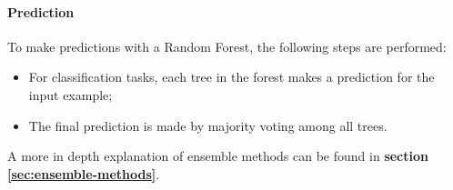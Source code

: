 \paragraph{Prediction}
To make predictions with a Random Forest, the following steps are performed:
\begin{itemize}
    \item For classification tasks, each tree in the forest makes a prediction for the input example;
    \item The final prediction is made by majority voting among all trees.
\end{itemize}
A more in depth explanation of ensemble methods can be found in \textbf{section \ref{sec:ensemble-methods}}.